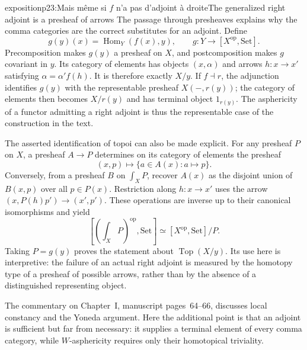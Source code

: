 \begin{dcomment}{exposition}{p23:Mais même si $f$ n'a pas d'adjoint à droite}{The generalized right adjoint is a presheaf of arrows}
The passage through presheaves explains why the comma categories are the correct substitutes for an adjoint. Define
\[
 g(y)(x)=\operatorname{Hom}_Y(f(x),y),\qquad
 g:Y\longrightarrow [X^{\mathrm{op}},\mathrm{Set}].
\]
Precomposition makes $g(y)$ a presheaf on $X$, and postcomposition makes $g$ covariant in $y$. Its category of elements has objects $(x,\alpha)$ and arrows $h:x\to x'$ satisfying $\alpha=\alpha'f(h)$. It is therefore exactly $X/y$. If $f\dashv r$, the adjunction identifies $g(y)$ with the representable presheaf $X(-,r(y))$; the category of elements then becomes $X/r(y)$ and has terminal object $1_{r(y)}$. The asphericity of a functor admitting a right adjoint is thus the representable case of the construction in the text.

The asserted identification of topoi can also be made explicit. For any presheaf $P$ on $X$, a presheaf $A\to P$ determines on its category of elements the presheaf
\[
 (x,p)\longmapsto\{a\in A(x):a\mapsto p\}.
\]
Conversely, from a presheaf $B$ on $\int_X P$, recover $A(x)$ as the disjoint union of $B(x,p)$ over all $p\in P(x)$. Restriction along $h:x\to x'$ uses the arrow $(x,P(h)p')\to(x',p')$. These operations are inverse up to their canonical isomorphisms and yield
\[
 [ (\textstyle\int_X P)^{\mathrm{op}},\mathrm{Set}]
 \simeq [X^{\mathrm{op}},\mathrm{Set}]/P.
\]
Taking $P=g(y)$ proves the statement about $\operatorname{Top}(X/y)$. Its use here is interpretive: the failure of an actual right adjoint is measured by the homotopy type of a presheaf of possible arrows, rather than by the absence of a distinguished representing object.

The commentary on Chapter~I, manuscript pages~64--66, discusses local constancy and the Yoneda argument. Here the additional point is that an adjoint is sufficient but far from necessary: it supplies a terminal element of every comma category, while $W$-asphericity requires only their homotopical triviality.
\end{dcomment}

